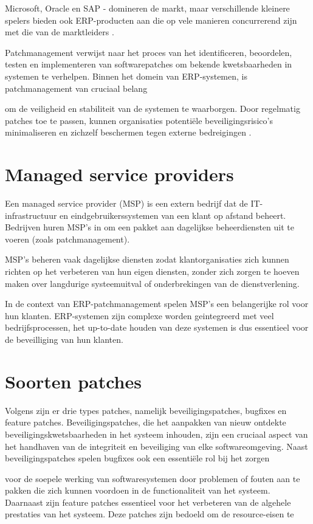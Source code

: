 Microsoft, Oracle en SAP - domineren de markt, maar verschillende kleinere spelers bieden ook ERP-producten aan die op vele manieren concurrerend zijn met die van de marktleiders \autocite{Pratt2023}.

Patchmanagement verwijst naar het proces van het identificeren, beoordelen, testen en implementeren van softwarepatches om bekende kwetsbaarheden in systemen te verhelpen. Binnen het domein van ERP-systemen, is patchmanagement van cruciaal belang

om de veiligheid en stabiliteit van de systemen te waarborgen. Door regelmatig patches toe te passen, kunnen organisaties potentiële beveiligingsrisico's minimaliseren en zichzelf beschermen tegen externe bedreigingen \autocite{Buenning2024}.

\section{Managed service providers}

Een managed service provider (MSP) is een extern bedrijf dat de IT-infrastructuur en eindgebruikerssystemen van een klant op afstand beheert. Bedrijven huren MSP's in om een pakket aan dagelijkse beheerdiensten uit te voeren (zoals patchmanagement).

MSP's beheren vaak dagelijkse diensten zodat klantorganisaties zich kunnen richten op het verbeteren van hun eigen diensten, zonder zich zorgen te hoeven maken over langdurige systeemuitval of onderbrekingen van de dienstverlening.

In de context van ERP-patchmanagement spelen MSP's een belangerijke rol voor hun klanten. ERP-systemen zijn complexe worden geintegreerd met veel bedrijfsprocessen, het up-to-date houden van deze systemen is dus essentieel voor de beveilliging van hun klanten. \autocite{Gillis2021}

\section{Soorten patches}
Volgens \textcite{Buenning2024} zijn er drie types patches, namelijk beveiligingspatches, bugfixes en feature patches. Beveiligingspatches, die het aanpakken van nieuw ontdekte beveiligingskwetsbaarheden in het systeem inhouden, zijn een cruciaal aspect van het handhaven van de integriteit en beveiliging van elke softwareomgeving. Naast beveiligingspatches spelen bugfixes ook een essentiële rol bij het zorgen 

voor de soepele werking van softwaresystemen door problemen of fouten aan te pakken die zich kunnen voordoen in de functionaliteit van het systeem. Daarnaast zijn feature patches essentieel voor het verbeteren van de algehele prestaties van het systeem. Deze patches zijn bedoeld om de resource-eisen te 

